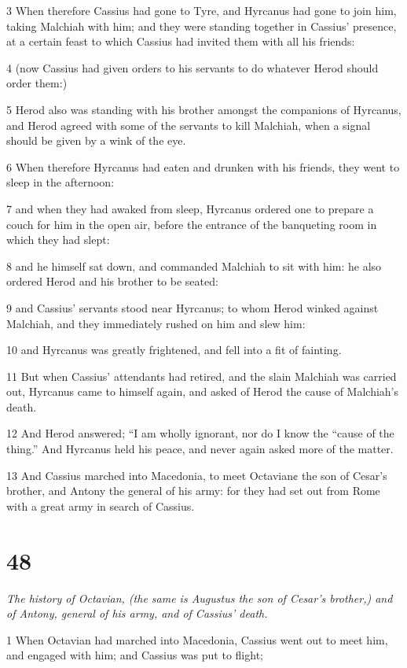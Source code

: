 3 When therefore Cassius had gone to Tyre, and Hyrcanus had gone to join him, taking Malchiah with him; and they were standing together in Cassius’ presence, at a certain feast to which Cassius had invited them with all his friends: 

4 (now Cassius had given orders to his servants to do whatever Herod should order them:) 

5 Herod also was standing with his brother amongst the companions of Hyrcanus, and Herod agreed with some of the servants to kill Malchiah, when a signal should be given by a wink of the eye. 

6 When therefore Hyrcanus had eaten and drunken with his friends, they went to sleep in the afternoon: 

7 and when they had awaked from sleep, Hyrcanus ordered one to prepare a couch for him in the open air, before the entrance of the banqueting room in which they had slept: 

8 and he himself sat down, and commanded Malchiah to sit with him: he also ordered Herod and his brother to be seated: 

9 and Cassius’ servants stood near Hyrcanus; to whom Herod winked against Malchiah, and they immediately rushed on him and slew him: 

10 and Hyrcanus was greatly frightened, and fell into a fit of fainting. 

11 But when Cassius’ attendants had retired, and the slain Malchiah was carried out, Hyrcanus came to himself again, and asked of Herod the cause of Malchiah’s death. 

12 And Herod answered; “I am wholly ignorant, nor do I know the “cause of the thing.” And Hyrcanus held his peace, and never again asked more of the matter. 

13 And Cassius marched into Macedonia, to meet Octavian¢ the son of Cesar’s brother, and Antony the general of his army: for they had set out from Rome with a great army in search of Cassius. 

\chapter{48}

\par \textit{The history of Octavian, (the same is Augustus the son of Cesar’s brother,) and of Antony, general of his army, and of Cassius’ death.}

1 When Octavian had marched into Macedonia, Cassius went out to meet him, and engaged with him; and Cassius was put to flight; 

